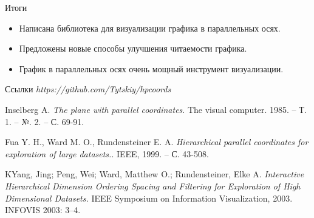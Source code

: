 \documentclass[fleqn, xcolor=x11names]{beamer}
\begin{document}
\begin{frame}{Итоги}
   
    \begin{itemize}
        \item Написана библиотека для визуализации графика в параллельных осях.
        \item Предложены новые способы улучшения читаемости графика.
        \item График в параллельных осях очень мощный инструмент визуализации.
    \end{itemize}
    
\end{frame}


\begin{frame}{Ссылки}
    \textit{https://github.com/Tytskiy/hpcoords}

    \vspace{10pt}

    \begin{thebibliography}{9}
        Inselberg A. 
        \textit{The plane with parallel coordinates}. 
        The visual computer. 1985. – Т. 1. – №. 2. – С. 69-91.
        
        Fua Y. H., Ward M. O., Rundensteiner E. A. 
        \textit{Hierarchical parallel coordinates for exploration of large datasets.}.
        IEEE, 1999. – С. 43-508.
        
        KYang, Jing; Peng, Wei; Ward, Matthew O.; Rundensteiner, Elke A.
        \textit{Interactive Hierarchical Dimension Ordering 
        Spacing and Filtering for Exploration of High Dimensional Datasets.}
        IEEE Symposium on Information Visualization, 2003. INFOVIS 2003: 3–4.
        \end{thebibliography}

    

     

    
    
\end{frame}
\end{document}
